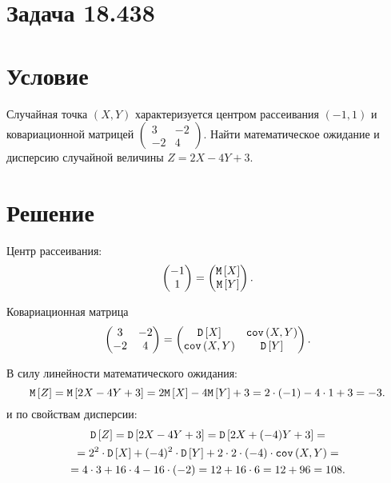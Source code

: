 \section{Задача 18.438}
\section*{Условие}
Случайная точка $\left ( X, Y \right )$ характеризуется центром рассеивания $(-1, 1)$ и ковариационной матрицей
$\begin{pmatrix}
     3  & -2 \\
     -2 & 4
\end{pmatrix}$.
Найти математическое ожидание и дисперсию случайной величины $Z = 2 X - 4 Y + 3$.

\section*{Решение}
Центр рассеивания:
\begin{equation}
    \begin{pmatrix}
        -1 \\
        1
    \end{pmatrix}
    =
    \begin{pmatrix}
        \mathtt{M} \left [ X \right ] \\
        \mathtt{M} \left [ Y \right ]
    \end{pmatrix}
    .
\end{equation}

Ковариационная матрица
\begin{equation}
    \begin{pmatrix}
        3  & -2 \\
        -2 & 4
    \end{pmatrix}
    =
    \begin{pmatrix}
        \mathtt{D} \left [ X \right ]      & \texttt{cov} \left ( X , Y \right ) \\
        \texttt{cov} \left ( X , Y \right ) & \mathtt{D} \left [ Y \right ]
    \end{pmatrix}
    .
\end{equation}

В силу линейности математического ожидания:
\begin{equation}
    \mathtt{M} \left [ Z \right ]
    = \mathtt{M} \left [ 2X - 4 Y + 3 \right ]
    = 2 \mathtt{M} \left [ X \right ] - 4 \mathtt{M} \left [ Y \right ] + 3
    = 2 \cdot (-1) - 4 \cdot 1 + 3
    = -3
    .
\end{equation}
и по свойствам дисперсии:
\begin{multline}
    \mathtt{D} \left [ Z \right ]
    = \mathtt{D} \left [ 2 X - 4 Y + 3 \right ]
    = \mathtt{D} \left [ 2 X + (-4) Y + 3 \right ] = \\
    = 2^2 \cdot \mathtt{D} \left [ X \right ] + (-4)^2 \cdot \mathtt{D} \left [ Y \right ] + 2 \cdot 2 \cdot (-4) \cdot \texttt{cov} \left ( X , Y \right ) = \\
    = 4 \cdot 3 + 16 \cdot 4 - 16 \cdot (-2)
    = 12 + 16 \cdot 6
    = 12 + 96
    = 108.
\end{multline}

